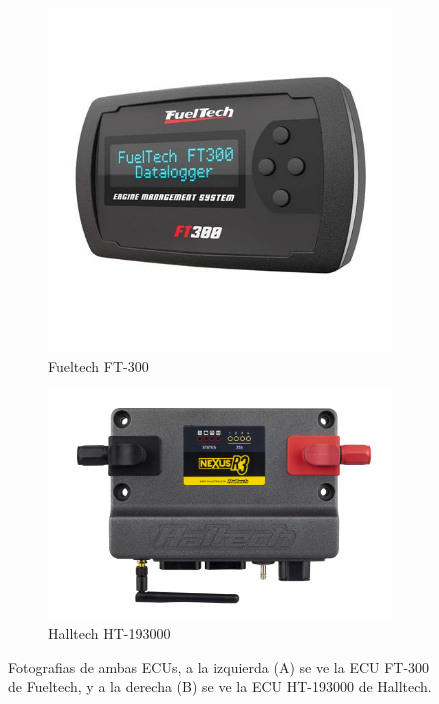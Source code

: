\begin{figure}[htpb]
\centering
\begin{subfigure}{.4\textwidth}
\centering
\includegraphics[width=\textwidth]{./Figures/fueltech-ft300.jpg}
\caption{Fueltech FT-300}
\label{fig:fueltech}
\end{subfigure}
\hfill
\begin{subfigure}{.5\textwidth}
\centering
\includegraphics[width=\textwidth]{./Figures/HT-193000_00.JPG}
\caption{Halltech HT-193000}
\label{fig:halltech}
\end{subfigure}
\hfill
\caption{Fotografias de ambas ECUs, a la izquierda (A) se ve la ECU FT-300 de Fueltech, y a la derecha (B) se ve la ECU HT-193000 de Halltech.}
\label{fig:comparativa}
\end{figure}
